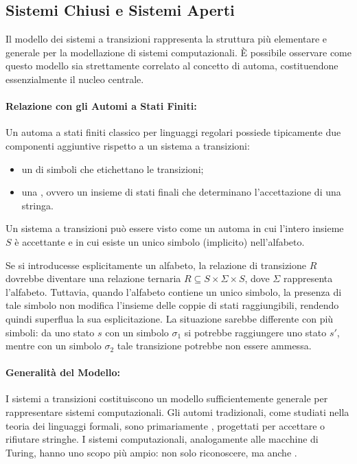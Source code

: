 \subsection{Sistemi Chiusi e Sistemi Aperti}

Il modello dei sistemi a transizioni rappresenta la struttura più elementare e generale per la modellazione di sistemi computazionali. È possibile osservare come questo modello sia strettamente correlato al concetto di automa, costituendone essenzialmente il nucleo centrale.

\paragraph{Relazione con gli Automi a Stati Finiti:}
Un automa a stati finiti classico per linguaggi regolari possiede tipicamente due componenti aggiuntive rispetto a un sistema a transizioni:

\begin{itemize}
  \item un  di simboli che etichettano le transizioni;
  \item una , ovvero un insieme di stati finali che determinano l'accettazione di una stringa.
\end{itemize}

Un sistema a transizioni può essere visto come un automa in cui l'intero insieme \(S\) è accettante e in cui esiste un unico simbolo (implicito) nell'alfabeto.

Se si introducesse esplicitamente un alfabeto, la relazione di transizione \(R\) dovrebbe diventare una relazione ternaria \(R \subseteq S \times \Sigma \times S\), dove \(\Sigma\) rappresenta l'alfabeto. Tuttavia, quando l'alfabeto contiene un unico simbolo, la presenza di tale simbolo non modifica l'insieme delle coppie di stati raggiungibili, rendendo quindi superflua la sua esplicitazione. La situazione sarebbe differente con più simboli: da uno stato \(s\) con un simbolo \(\sigma_1\) si potrebbe raggiungere uno stato \(s'\), mentre con un simbolo \(\sigma_2\) tale transizione potrebbe non essere ammessa.

\paragraph{Generalità del Modello:}
I sistemi a transizioni costituiscono un modello sufficientemente generale per rappresentare sistemi computazionali. Gli automi tradizionali, come studiati nella teoria dei linguaggi formali, sono primariamente , progettati per accettare o rifiutare stringhe.
I sistemi computazionali, analogamente alle macchine di Turing, hanno uno scopo più ampio: non solo riconoscere, ma anche .

